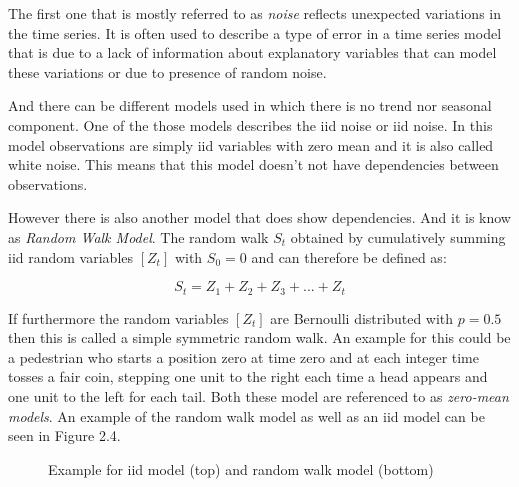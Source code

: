 The first one that is mostly referred to as \textit{noise} reflects unexpected variations in the time series. It is often used to describe a type of error in a time series model that is due to a lack of information about explanatory variables that can model these variations or due to presence of random noise.

And there can be different models used in which there is no trend nor seasonal component. One of the those models describes the \acl{iid} noise or \acs{iid} noise. In this model observations are simply \acl{iid} variables with zero mean and it is also called white noise. This means that this model doesn't not have dependencies between observations.

However there is also another model that does show dependencies. And it is know as \textit{Random Walk Model}. The random walk \(S_t \) obtained by cumulatively summing \acs{iid} random variables \([Z_t]\) with \(S_0=0\) and can therefore be defined as:

\begin{equation}\label{eq:random_walk_model}
S_t = Z_1 + Z_2 + Z_3 + ... + Z_t
\end{equation}

If furthermore the random variables \([Z_t] \) are Bernoulli distributed with \(p=0.5\) then this is called a simple symmetric random walk. An example for this could be a pedestrian who starts a position zero at time zero and at each integer time tosses a fair coin, stepping one unit to the right each time a head appears and one unit to the left for each tail. Both these model are referenced to as \textit{zero-mean models}.
An example of the random walk model as well as an \acs{iid} model can be seen in Figure 2.4.

\begin{figure}[ht]
	\centering
	\caption{Example for iid model (top) and random walk model (bottom)}
\end{figure}

